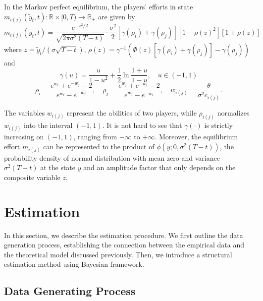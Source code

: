 \documentclass[mnsc]{informs3}
\begin{document}
\begin{lemma}
In the Markov perfect equilibrium, the players’ efforts in state $m_{i(j)}(\tilde{y}_t, t) :\mathbb{R}\times[0, T)\to\mathbb{R}_+$ are given by
\begin{equation}\label{eq-equilibrium-effort}
m_{i(j)}(\tilde{y}_t, t) = \frac{e^{-z^2/2}}{\sqrt{2\pi\sigma^2(T-t)}}\cdot \frac{\sigma^2}{2}\left[\gamma(\rho_{i}) + \gamma(\rho_{j})\right]\left[1-\rho(z)^2\right]\left[1 \pm \rho(z)\right]
\end{equation}
where $z = \tilde{y}_t / (\sigma\sqrt{T-t})$, $\rho(z) = \gamma^{-1}\left(\Phi(z)\left[\gamma(\rho_{i})+\gamma(\rho_{j})\right]-\gamma(\rho_{j})\right)$ and 
\begin{equation*}
\gamma(u) = \frac{u}{1-u^2} + \frac{1}{2}\ln\frac{1+u}{1-u},\quad u\in(-1,1)
\end{equation*}
\begin{equation*}
\rho_{i} = \frac{e^{w_{i}}+e^{-w_{j}}-2}{e^{w_{i}}-e^{-w_{j}}},
\quad
\rho_{j} = \frac{e^{w_{j}}+e^{-w_{i}}-2}{e^{w_{j}}-e^{-w_{i}}},
\quad
w_{i(j)} = \frac{\theta}{\sigma^2 c_{i(j)}}.
\end{equation*}
\end{lemma}

The variables $w_{i(j)}$ represent the abilities of two players, while $\rho_{i(j)}$ normalizes $w_{i(j)}$ into the interval $(-1, 1)$. 
It is not hard to see that $\gamma(\cdot)$ is strictly increasing on $(-1,1)$, ranging from $-\infty$ to $+\infty$. 
Moreover, the equilibrium effort $m_{i(j)}$ can be represented to the product of $\phi(y; 0, \sigma^2(T-t))$, the probability density of normal distribution with mean zero and variance $\sigma^2(T-t)$ at the state $y$ and an amplitude factor that only depends on the composite variable $z$. 








\section{Estimation}

In this section, we describe the estimation procedure. 
We first outline the data generation process, establishing the connection between the empirical data and the theoretical model discussed previously.
Then, we introduce a structural estimation method using Bayesian framework.

\subsection{Data Generating Process}
\end{document}
